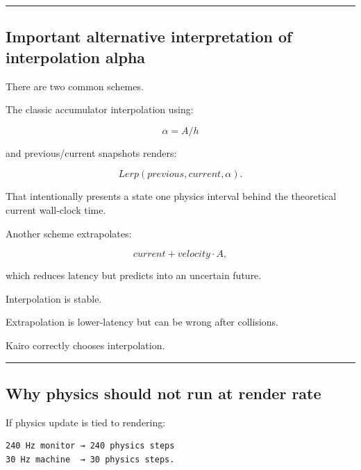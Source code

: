 \begin{center}\rule{0.5\linewidth}{0.5pt}\end{center}

\subsection{Important alternative interpretation of interpolation alpha}\label{06-engine-ii-ch038-important-alternative-interpretation-of-interpolation-alpha}

\hypertarget{06-engine-ii-ch038-important-alternative-interpretation-of-interpolation-alpha}{}

There are two common schemes.

The classic accumulator interpolation using:

\[
\alpha=A/h
\]

and previous/current snapshots renders:

\[
Lerp(previous,current,\alpha).
\]

That intentionally presents a state one physics interval behind the theoretical current wall-clock time.

Another scheme extrapolates:

\[
current + velocity\cdot A,
\]

which reduces latency but predicts into an uncertain future.

Interpolation is stable.

Extrapolation is lower-latency but can be wrong after collisions.

Kairo correctly chooses interpolation.

\begin{center}\rule{0.5\linewidth}{0.5pt}\end{center}

\subsection{Why physics should not run at render rate}\label{06-engine-ii-ch038-why-physics-should-not-run-at-render-rate}

\hypertarget{06-engine-ii-ch038-why-physics-should-not-run-at-render-rate}{}

If physics update is tied to rendering:

\begin{verbatim}
240 Hz monitor → 240 physics steps
30 Hz machine  → 30 physics steps.
\end{verbatim}

